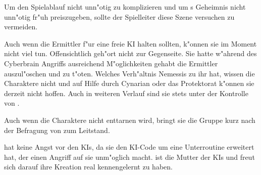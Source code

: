 \begin{remarks}
	Um den Spielablauf nicht unn"otig zu komplizieren und um \xl{}s Geheimnis nicht unn"otig fr"uh preiszugeben, sollte der Spielleiter diese Szene versuchen zu vermeiden. 
	
	Auch wenn die Ermittler \xl{} f"ur eine freie KI halten sollten, k"onnen sie im Moment nicht viel tun. Offensichtlich geh"ort \xl{} nicht zur Gegenseite. Sie hatte w"ahrend des Cyberbrain Angriffs ausreichend M"oglichkeiten gehabt die Ermittler auszul"oschen und \ml{} zu t"oten. Welches Verh"altnis Nemessis zu ihr hat, wissen die Charaktere nicht und auf Hilfe durch Cynarian oder das Protektorat k"onnen sie derzeit nicht hoffen. Auch in weiteren Verlauf sind sie stets unter der Kontrolle von \xl{}.

	Auch wenn die Charaktere \xl{} nicht enttarnen wird, bringt sie die Gruppe kurz nach der Befragung von \ml{} zum Leitstand.

	\ml{} hat keine Angst vor den KIs, da sie den KI-Code um eine Unterroutine erweitert hat, der einen Angriff auf sie unm"oglich macht. \ml{} ist die Mutter der KIs und freut sich darauf ihre Kreation real kennengelernt zu haben.
\end{remarks}
